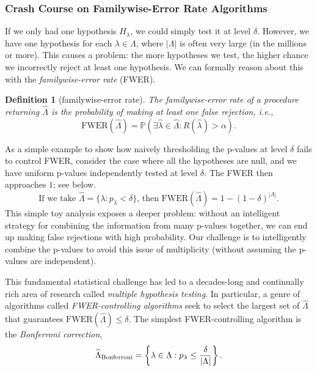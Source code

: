 \documentclass[10pt]{article}
\newtheorem{definition}{Definition}
\newcommand{\lhat}{\hat{\lambda}}
\newcommand{\Lhat}{\widehat{\Lambda}}
\renewcommand{\P}{\mathbb{P}}
\begin{document}
\subsubsection{Crash Course on Familywise-Error Rate Algorithms}
\label{sec:fwer-control}

If we only had one hypothesis $H_{\lambda}$, we could simply test it at level $\delta$.
However, we have one hypothesis for each $\lambda \in \Lambda$, where $|\Lambda|$ is often very large (in the millions or more).
This causes a problem: the more hypotheses we test, the higher chance we incorrectly reject at least one hypothesis.
We can formally reason about this with the \emph{familywise-error rate} (FWER).
\begin{definition}[familywise-error rate]
  The familywise-error rate of a procedure returning $\hat{\Lambda}$ is the probability of making at least one false rejection, i.e., 
  \begin{equation}
      \mathrm{FWER}\left(\Lhat\right) = \P\left( \exists \lhat \in \Lhat : R(\lhat) > \alpha \right).
  \end{equation}
\end{definition}
As a simple example to show how naively thresholding the p-values at level $\delta$ fails to control FWER, consider the case where all the hypotheses are null, and we have uniform p-values independently tested at level $\delta$. The FWER then approaches $1$; see below.
\begin{equation}
    \text{If we take } \Lhat = \{\lambda : p_{\lambda} < \delta\} \text{, then } \mathrm{FWER}(\Lhat) = 1-(1-\delta)^{|\Lambda|}.
\end{equation}
This simple toy analysis exposes a deeper problem: without an intelligent strategy for combining the information from many p-values together, we can end up making false rejections with high probability.
Our challenge is to intelligently combine the p-values to avoid this issue of multiplicity (without assuming the p-values are independent).

This fundamental statistical challenge has led to a decades-long and continually rich area of research called \emph{multiple hypothesis testing}.
In particular, a genre of algorithms called \emph{FWER-controlling algorithms} seek to select the largest set of $\Lhat$ that guarantees $\mathrm{FWER}(\Lhat) \leq \delta$.
The simplest FWER-controlling algorithm is the \emph{Bonferroni correction},
\begin{equation}
    \Lhat_{\rm Bonferroni} = \left\{ \lambda \in \Lambda : p_{\lambda} \leq \frac{\delta}{|\Lambda|}\right\}.
\end{equation}
\end{document}
